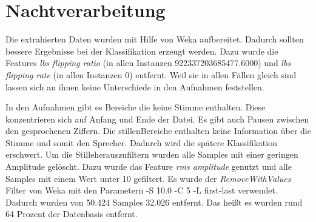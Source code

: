 \section{Nachtverarbeitung}
\label{post}
Die extrahierten Daten wurden mit Hilfe von Weka aufbereitet. Dadurch sollten bessere Ergebnisse bei der Klassifikation erzeugt werden. Dazu wurde die Features \textit{lbs flipping ratio} (in allen Instanzen 922337203685477.6000) und \textit{lbs flipping rate} (in allen Instanzen 0) entfernt. Weil sie in allen Fällen gleich sind lassen sich an ihnen keine Unterschiede in den Aufnahmen feststellen.

In den Aufnahmen gibt es Bereiche die keine Stimme enthalten. Diese konzentrieren sich auf Anfang und Ende der Datei. Es gibt auch Pausen zwischen den gesprochenen Ziffern. Die \grqq stillen\grqq  Bereiche enthalten keine Information über die Stimme und somit den Sprecher. Dadurch wird die spätere Klassifikation erschwert. Um die \grqq Stille\grqq  herauszufiltern wurden alle Samples mit einer geringen Amplitude gelöscht. Dazu wurde das Feature \textit{rms amplitude} genutzt und alle Samples mit einem Wert unter 10 gefiltert. Es wurde der \textit{RemoveWithValues} Filter von Weka mit den Parametern -S 10.0 -C 5 -L first-last verwendet. Dadurch wurden von 50.424 Samples 32.026 entfernt. Das heißt es wurden rund 64 Prozent der Datenbasis entfernt.
